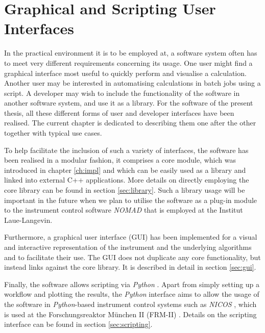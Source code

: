 %
%

\chapter{Graphical and Scripting User Interfaces}
\label{ch:gui}
In the practical environment it is to be employed at, a software system often has to meet very different 
requirements concerning its usage. One user might find a graphical interface most useful to quickly
perform and visualise a calculation. Another user may be interested in automatising calculations 
in batch jobs using a script. A developer may wish to include the functionality of the software
in another software system, and use it as a library.
For the software of the present thesis, all these different forms of user and developer interfaces
have been realised. The current chapter is dedicated to describing them one after the other together
with typical use cases.

To help facilitate the inclusion of such a variety of interfaces, the software has been realised in a 
modular fashion, it comprises a core module, which was introduced in chapter \ref{ch:impl} 
and which can be easily used as a library and linked into external C++ applications. 
More details on directly employing the core library can be found in section \ref{sec:library}.
Such a library usage will be important in the future when we plan to utilise the software as a 
plug-in module to the instrument control software \textit{NOMAD} \cite{web_NOMAD} that is 
employed at the Institut Laue-Langevin.

Furthermore, a graphical user interface (GUI) has been implemented for a visual and interactive 
representation of the instrument and the underlying algorithms and to facilitate their use.
The GUI does not duplicate any core functionality, but instead links against the core library.
It is described in detail in section \ref{sec:gui}.

Finally, the software allows scripting via \textit{Python} \cite{Rossum2011, web_python}. 
Apart from simply setting up a workflow and plotting the results, the \textit{Python} interface 
aims to allow the usage of the software in \textit{Python}-based instrument control systems such as 
\textit{NICOS} \cite{web_NICOS}, which is used at the Forschungsreaktor M\"unchen II (FRM-II) \cite{web_mlz}. 
Details on the scripting interface can be found in section \ref{sec:scripting}.



